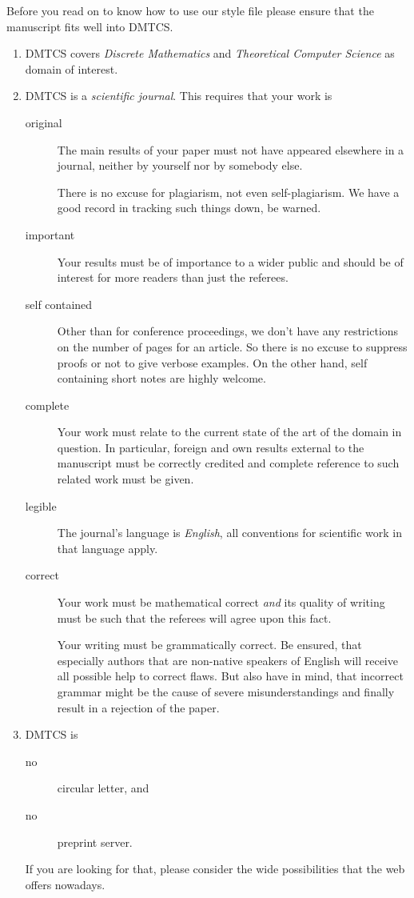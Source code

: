 \documentclass[
submission
]{dmtcs-episciences}
\begin{document}
Before you read on to know how to use our style file please ensure
that the manuscript fits well into DMTCS.
\begin{enumerate}
\item DMTCS covers \emph{Discrete Mathematics} and \emph{Theoretical 
    Computer Science} as domain of interest. 
\item DMTCS is a \emph{scientific journal}. This requires that your
  work is

  \begin{description}
  \item[original] The main results of your paper must not have
    appeared elsewhere in a journal, neither by yourself nor by
    somebody else.

    There is no excuse for plagiarism, not even self-plagiarism. We
    have a good record in tracking such things down, be warned.
  \item[important] Your results must be of importance to a wider
    public and should be of interest for more readers than just the
    referees. 
  \item[self contained] Other than for conference proceedings, we
    don't have any restrictions on the number of pages for an
    article. So there is no excuse to suppress proofs or not to give
    verbose examples. On the other hand, self containing short notes
    are highly welcome.
  \item[complete] Your work must relate to the current state of the
    art of the domain in question. In particular, foreign and own
    results external to the manuscript must be correctly credited and
    complete reference to such related work must be given. 
  \item[legible] The journal's language is \emph{English}, all
    conventions for scientific work in that language apply. 

  \item[correct] Your work must be mathematical correct \emph{and}
    its quality of writing must be such that the referees will agree
    upon this fact.

    Your writing must be grammatically correct. Be ensured, that
    especially authors that are non-native speakers of English will
    receive all possible help to correct flaws. But also have in mind,
    that incorrect grammar might be the cause of severe
    misunderstandings and finally result in a rejection of the
    paper.  
  \end{description}
\item DMTCS is 
  \begin{description}
  \item[no] circular letter, and
  \item[no] preprint server.
  \end{description}
  If you are looking for that, please consider the wide
  possibilities that the web offers nowadays.
\end{enumerate}
\end{document}
